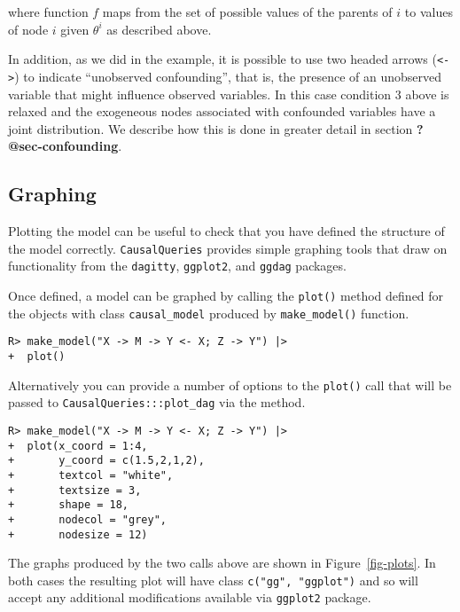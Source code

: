 \documentclass[
  11pt,
  article]{jss}
\begin{document}
where function \(f\) maps from the set of possible values of the parents
of \(i\) to values of node \(i\) given \(\theta^i\) as described above.

In addition, as we did in the \citet{chickering1996clinician} example,
it is possible to use two headed arrows
(\texttt{\textless{}-\textgreater{}}) to indicate ``unobserved
confounding'', that is, the presence of an unobserved variable that
might influence observed variables. In this case condition 3 above is
relaxed and the exogeneous nodes associated with confounded variables
have a joint distribution. We describe how this is done in greater
detail in section \textbf{?@sec-confounding}.

\hypertarget{graphing}{%
\subsection{Graphing}\label{graphing}}

Plotting the model can be useful to check that you have defined the
structure of the model correctly. \texttt{CausalQueries} provides simple
graphing tools that draw on functionality from the \texttt{dagitty},
\texttt{ggplot2}, and \texttt{ggdag} packages.

Once defined, a model can be graphed by calling the \texttt{plot()}
method defined for the objects with class \texttt{causal\_model}
produced by \texttt{make\_model()} function.

\begin{verbatim}
R> make_model("X -> M -> Y <- X; Z -> Y") |>
+  plot()
\end{verbatim}

Alternatively you can provide a number of options to the \texttt{plot()}
call that will be passed to \texttt{CausalQueries:::plot\_dag} via the
method.

\begin{verbatim}
R> make_model("X -> M -> Y <- X; Z -> Y") |>
+  plot(x_coord = 1:4,
+       y_coord = c(1.5,2,1,2),
+       textcol = "white",
+       textsize = 3,
+       shape = 18,
+       nodecol = "grey",
+       nodesize = 12)
\end{verbatim}

The graphs produced by the two calls above are shown in
Figure~\ref{fig-plots}. In both cases the resulting plot will have class
\texttt{c("gg",\ "ggplot")} and so will accept any additional
modifications available via \texttt{ggplot2} package.
\end{document}
